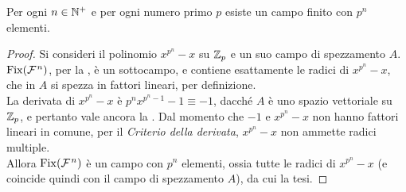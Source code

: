 \documentclass[11pt]{scrbook}
\begin{document}
\begin{theorem}
    Per ogni $n \in \mathbb N^+$ e per ogni numero primo $p$ esiste un
    campo finito con $p^n$ elementi.
\end{theorem}

\begin{proof}
    Si consideri il polinomio $x^{p^n}-x$ su $\mathbb{Z}_p$ e un suo
    campo di spezzamento $A$. $\operatorname{Fix}(\mathcal{F}{\mkern 1.5mu}^n)$, per
    la , è
    un sottocampo, e
    contiene esattamente le radici di $x^{p^n}-x$, che
    in $A$ si spezza in fattori lineari, per definizione. \\

    La derivata di $x^{p^n}-x$ è $p^n x^{p^n - 1}-1 \equiv -1$,
    dacché $A$ è uno spazio vettoriale su $\mathbb{Z}_p$, e pertanto
    vale ancora la .
    Dal momento che $-1$ e $x^{p^n}-x$ non hanno fattori lineari
    in comune, per il \textit{Criterio della derivata},
    $x^{p^n}-x$ non ammette radici multiple. \\

    Allora $\operatorname{Fix}(\mathcal{F}{\mkern 1.5mu}^n)$ è un campo con $p^n$ elementi,
    ossia tutte le radici di $x^{p^n}-x$ (e coincide quindi
    con il campo di spezzamento $A$), da cui la tesi.
\end{proof}
\end{document}
